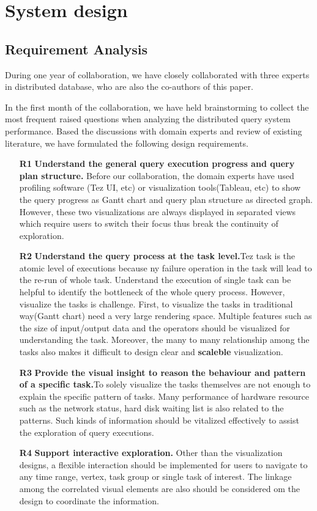 \section{System design}


\subsection{Requirement Analysis}
During one year of collaboration, we have closely collaborated with three experts in distributed database, who are also the co-authors of this paper.

In the first month of the collaboration, we have held brainstorming to collect the most frequent raised questions when analyzing the distributed query system performance. Based the discussions with domain experts and review of existing literature, we have formulated the following design requirements.

\begin{itemize}
  \item[\textbf{R1}]\textbf{Understand the general query execution progress and query plan structure.} Before our collaboration, the domain experts have used profiling software (Tez  UI, etc) or visualization tools(Tableau, etc) to show the query progress as Gantt chart and query plan structure as directed graph. However, these two visualizations are always displayed in separated views which require users to switch their focus thus break the continuity of exploration.
  \item[\textbf{R2}]\textbf{Understand the query process at the task level.}Tez task is the atomic level of executions because ny failure operation in the task will lead to the re-run of whole task. Understand the execution of single task can be helpful to identify the bottleneck of the whole query process. However, visualize the tasks is challenge. First, to visualize the tasks in traditional way(Gantt chart) need a very large rendering space. Multiple features such as the size of input/output data and the operators should be visualized for understanding the task. Moreover, the many to many relationship among the tasks also makes it difficult to design clear and \textbf{scaleble} visualization.
  \item[\textbf{R3}]\textbf{Provide the visual insight to reason the behaviour and pattern of a specific task.}To solely visualize the tasks themselves are not enough to explain the specific pattern of tasks. Many performance of hardware resource such as the network status, hard disk waiting list is also related to the patterns. Such kinds of information should be vitalized effectively to assist the exploration of query executions. 
  \item[\textbf{R4}]\textbf{ Support interactive exploration.} Other than the visualization designs, a flexible interaction should be implemented for users to navigate to any time range, vertex, task group or single task of interest. The linkage among the correlated visual elements are also should be considered om the design to coordinate the information.

\end{itemize}

